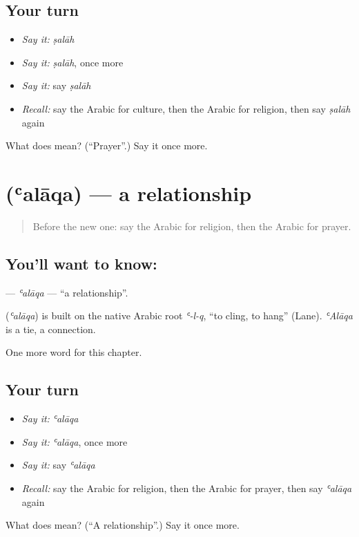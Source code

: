 \subsection*{Your turn}
\begin{itemize}
\raggedright
  \item \emph{Say it:} \emph{ṣalāh}
  \item \emph{Say it:} \emph{ṣalāh}, once more
  \item \emph{Say it:} say \emph{ṣalāh}
  \item \emph{Recall:} say the Arabic for culture, then the Arabic for religion, then say \emph{ṣalāh} again
\end{itemize}

\begin{tcolorbox}[breakable,colback=teal!4,colframe=teal!35!black,title={Before you move on}]
What does  mean? (\textquotedblleft{}Prayer\textquotedblright{}.) Say it once more.
\end{tcolorbox}
\section[\texorpdfstring{\ar{علاقة} (ʿalāqa)}{علاقة (ʿalāqa)}]{ (ʿalāqa) — a relationship}

\label{lesson:AR-C267-alaqa}



\begin{quote}
Before the new one: say the Arabic for religion, then the Arabic for prayer.
\end{quote}

\subsection*{You'll want to know: }
\textbf{} — \emph{ʿalāqa} — \textquotedblleft{}a relationship\textquotedblright{}.

\begin{cousinweb}
\textbf{} (\emph{ʿalāqa}) is built on the native Arabic root \emph{ʿ-l-q}, \textquotedblleft{}to cling, to hang\textquotedblright{} (Lane). \emph{ʿAlāqa} is a tie, a connection.
\end{cousinweb}

\begin{grammarlens}[title={What you've built}]
One more word for this chapter.
\end{grammarlens}

\subsection*{Your turn}
\begin{itemize}
\raggedright
  \item \emph{Say it:} \emph{ʿalāqa}
  \item \emph{Say it:} \emph{ʿalāqa}, once more
  \item \emph{Say it:} say \emph{ʿalāqa}
  \item \emph{Recall:} say the Arabic for religion, then the Arabic for prayer, then say \emph{ʿalāqa} again
\end{itemize}

\begin{tcolorbox}[breakable,colback=teal!4,colframe=teal!35!black,title={Before you move on}]
What does  mean? (\textquotedblleft{}A relationship\textquotedblright{}.) Say it once more.
\end{tcolorbox}
